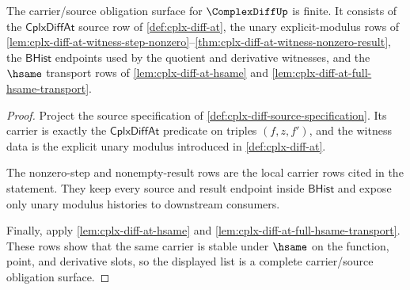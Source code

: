 \begin{theorem}
\label{thm:cplx-diff-carrier-obligation-surface}
The carrier/source obligation surface for $\ComplexDiffUp$ is finite. It
consists of the $\mathsf{CplxDiffAt}$ source row of
\autoref{def:cplx-diff-at}, the unary explicit-modulus rows of
\autoref{lem:cplx-diff-at-witness-step-nonzero}--\autoref{thm:cplx-diff-at-witness-nonzero-result},
the $\mathsf{BHist}$ endpoints used by the quotient and derivative witnesses,
and the $\hsame$ transport rows of \autoref{lem:cplx-diff-at-hsame} and
\autoref{lem:cplx-diff-at-full-hsame-transport}.
\end{theorem}
\begin{proof}
Project the source specification of
\autoref{def:cplx-diff-source-specification}. Its carrier is exactly the
$\mathsf{CplxDiffAt}$ predicate on triples $(f,z,f')$, and the witness data is
the explicit unary modulus introduced in \autoref{def:cplx-diff-at}.

The nonzero-step and nonempty-result rows are the local carrier rows cited in
the statement. They keep every source and result endpoint inside
$\mathsf{BHist}$ and expose only unary modulus histories to downstream
consumers.

Finally, apply \autoref{lem:cplx-diff-at-hsame} and
\autoref{lem:cplx-diff-at-full-hsame-transport}. These rows show that the same
carrier is stable under $\hsame$ on the function, point, and derivative slots,
so the displayed list is a complete carrier/source obligation surface.
\end{proof}

